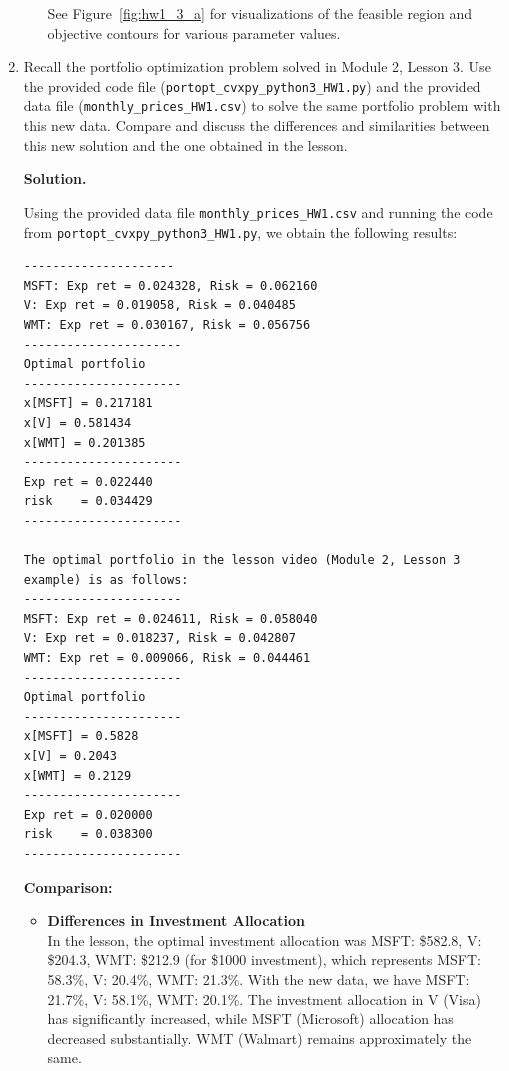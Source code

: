 \documentclass{article}
\begin{document}
\begin{enumerate}
\begin{enumerate}
See Figure~\ref{fig:hw1_3_a} for visualizations of the feasible region and objective contours for various parameter values.

\end{enumerate}

\item Recall the portfolio optimization problem solved in Module 2, Lesson 3. Use the provided code file (\texttt{portopt\_cvxpy\_python3\_HW1.py}) and the provided data file (\texttt{monthly\_prices\_HW1.csv}) to solve the same portfolio problem with this new data. Compare and discuss the differences and similarities between this new solution and the one obtained in the lesson.

\hrulefill

\textbf{Solution.}

Using the provided data file \texttt{monthly\_prices\_HW1.csv} and running the code from \texttt{portopt\_cvxpy\_python3\_HW1.py}, we obtain the following results:

\begin{verbatim}
---------------------
MSFT: Exp ret = 0.024328, Risk = 0.062160
V: Exp ret = 0.019058, Risk = 0.040485
WMT: Exp ret = 0.030167, Risk = 0.056756
----------------------
Optimal portfolio
----------------------
x[MSFT] = 0.217181
x[V] = 0.581434
x[WMT] = 0.201385
----------------------
Exp ret = 0.022440
risk    = 0.034429
----------------------

The optimal portfolio in the lesson video (Module 2, Lesson 3 example) is as follows:
----------------------
MSFT: Exp ret = 0.024611, Risk = 0.058040
V: Exp ret = 0.018237, Risk = 0.042807
WMT: Exp ret = 0.009066, Risk = 0.044461
----------------------
Optimal portfolio
----------------------
x[MSFT] = 0.5828
x[V] = 0.2043
x[WMT] = 0.2129
----------------------
Exp ret = 0.020000
risk    = 0.038300
----------------------

\end{verbatim}

\textbf{Comparison:}

\begin{itemize}
    \item \textbf{Differences in Investment Allocation} \\
    In the lesson, the optimal investment allocation was MSFT: \$582.8, V: \$204.3, WMT: \$212.9 (for \$1000 investment), which represents MSFT: 58.3\%, V: 20.4\%, WMT: 21.3\%. With the new data, we have MSFT: 21.7\%, V: 58.1\%, WMT: 20.1\%. The investment allocation in V (Visa) has significantly increased, while MSFT (Microsoft) allocation has decreased substantially. WMT (Walmart) remains approximately the same.
    

\end{itemize}
\end{enumerate}
\end{document}

